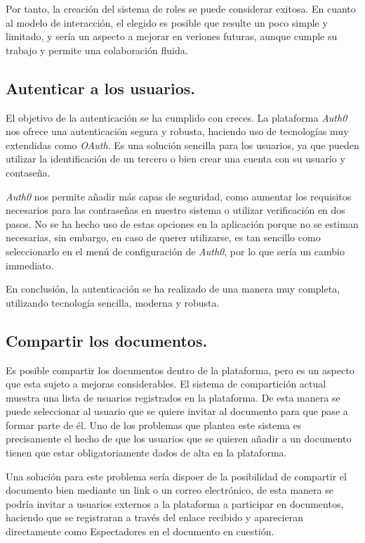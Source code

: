 \documentclass[11pt,spanish,listoffigures,listoftables]{tfgetsinf}
\begin{document}
Por tanto, la creación del sistema de roles se puede considerar exitosa. En cuanto al modelo de interacción, el elegido es posible que resulte un poco simple y limitado, y sería un aspecto a mejorar en veriones futuras, aunque cumple su trabajo y permite una colaboración fluida. 

\subsection{Autenticar a los usuarios.}
\label{subsec:objetivos-conc-auth}

El objetivo de la autenticación se ha cumplido con creces. La plataforma \textit{Auth0} nos ofrece una autenticación segura y robusta, haciendo uso de tecnologías muy extendidas como \textit{OAuth}. Es una solución sencilla para los usuarios, ya que pueden utilizar la identificación de un tercero o bien crear una cuenta con su usuario y contaseña. 

\textit{Auth0} nos permite añadir más capas de seguridad, como aumentar los requisitos necesarios para las contraseñas en nuestro sistema o utilizar verificación en dos pasos. No se ha hecho uso de estas opciones en la aplicación porque no se estiman necesarias, sin embargo, en caso de querer utilizarse, es tan sencillo como seleccionarlo en el menú de configuración de \textit{Auth0}, por lo que sería un cambio immediato.

En conclusión, la autenticación se ha realizado de una manera muy completa, utilizando tecnología sencilla, moderna y robusta.

\subsection{Compartir los documentos.}
\label{subsec:objetivos-conc-compartir}

Es posible compartir los documentos dentro de la plataforma, pero es un aspecto que esta sujeto a mejoras considerables. El sistema de compartición actual muestra una lista de usuarios registrados en la plataforma. De esta manera se puede seleccionar al usuario que se quiere invitar al documento para que pase a formar parte de él. Uno de los problemas que plantea este sistema es precisamente el hecho de que los usuarios que se quieren añadir a un documento tienen que estar obligatoriamente dados de alta en la plataforma.

Una solución para este problema sería dispoer de la posibilidad de compartir el documento bien mediante un link o un correo electrónico, de esta manera se podría invitar a usuarios externos a la plataforma a participar en documentos, haciendo que se registraran a través del enlace recibido y aparecieran directamente como Espectadores en el documento en cuestión.
\end{document}
